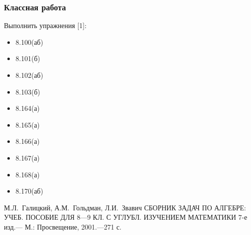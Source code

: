 \documentclass[algebra,a5paper]{pum}
\date{19.05.20}
\begin{document}
\subsubsection*{Классная работа}

Выполнить упражнения [1]:

  \begin{itemize}
  \color{darkcolortheme}
    \item 8.100(аб)
    \item 8.101(б)
    \item 8.102(аб)
    \item 8.103(б)
    \item 8.164(а)
    \item 8.165(а) 
    \item 8.166(а)
    \item 8.167(а)
    \item 8.168(а)
    \item 8.170(аб)
  \end{itemize}

  \bigskip
[1] М.Л.~Галицкий, А.М.~Гольдман, Л.И.~Звавич СБОРНИК ЗАДАЧ ПО АЛГЕБРЕ:
УЧЕБ. ПОСОБИЕ ДЛЯ 8—9 КЛ. С УГЛУБЛ. ИЗУЧЕНИЕМ МАТЕМАТИКИ 7-е изд.— М.: Просвещение, 2001.—271 с.
\end{document}
